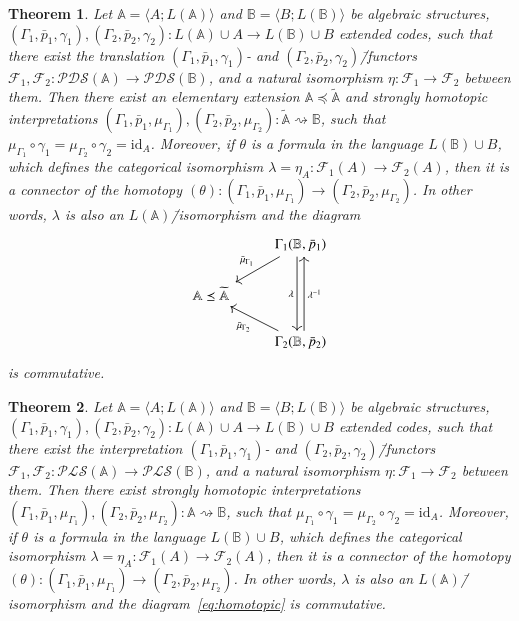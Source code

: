 \documentclass[12pt]{article}
\newtheorem{theorem}{Theorem}
\theoremstyle{definition}
\def\MA{{\mathbb{A}}}
\def\MB{{\mathbb{B}}}
\newcommand{\nsA}{\widetilde{\mathbb A}}
\def\F{{\mathcal{F}}}
\def\PLS{{\mathcal{PLS}}}
\def\PDS{{\mathcal{PDS}}}
\def\id{{\mathrm{id}}}
\begin{document}
\begin{theorem}\label{th:natur_iso1}
Let $\MA=\langle A; L(\MA)\rangle$ and $\MB=\langle B; L(\MB)\rangle$ be algebraic structures, $(\Gamma_1,\bar p_1,\gamma_1),(\Gamma_2,\bar p_2,\gamma_2)\colon L(\MA)\cup A\to L(\MB)\cup B$ extended codes, such that there exist the translation $(\Gamma_1,\bar p_1,\gamma_1)$- and $(\Gamma_2,\bar p_2,\gamma_2)$\=/functors $\F_1,\F_2\colon\PDS(\MA)\to\PDS(\MB)$, and a natural isomorphism $\eta\colon \F_1\to\F_2$ between them. Then there exist an elementary extension $\MA\preceq \nsA$ and strongly homotopic interpretations $(\Gamma_1,\bar p_1,\mu_{\Gamma_1}),(\Gamma_2,\bar p_2,\mu_{\Gamma_2})\colon \nsA \rightsquigarrow \MB$, such that $\mu_{\Gamma_1} \circ\gamma_1=\mu_{\Gamma_2} \circ\gamma_2=\id_A$. Moreover, if $\theta$ is a formula in the language $L(\MB)\cup B$, which defines the categorical isomorphism $\lambda=\eta_A\colon \F_1(A)\to \F_2(A)$, then it is a connector of the homotopy $(\theta)\colon (\Gamma_1,\bar p_1,\mu_{\Gamma_1})\to(\Gamma_2,\bar p_2,\mu_{\Gamma_2})$. In other words, $\lambda$ is also an $L(\MA)$\=/isomorphism and the diagram   
\begin{equation*}
\begin{tikzcd}
& \Gamma_1(\MB,\bar p_1) \ar[dl, "\bar{\mu}_{\Gamma_1}"'] 
\ar[dd, shift right, "\lambda"']\\
\MA\preceq\nsA  & \\
& \Gamma_2(\MB,\bar p_2) 
\ar[ul, "\bar{\mu}_{\Gamma_2}"] 
\ar[uu, shift right, "\lambda^{-1}"']
\end{tikzcd} 
\end{equation*} 
is commutative.    
\end{theorem}

\begin{theorem}\label{th:natur_iso2}
Let $\MA=\langle A; L(\MA)\rangle$ and $\MB=\langle B; L(\MB)\rangle$ be algebraic structures, $(\Gamma_1,\bar p_1,\gamma_1),(\Gamma_2,\bar p_2,\gamma_2)\colon L(\MA)\cup A\to L(\MB)\cup B$ extended codes, such that there exist the interpretation $(\Gamma_1,\bar p_1,\gamma_1)$- and $(\Gamma_2,\bar p_2,\gamma_2)$\=/functors $\F_1,\F_2\colon\PLS(\MA)\to\PLS(\MB)$, and a natural isomorphism $\eta\colon \F_1\to\F_2$ between them. Then there exist strongly homotopic interpretations $(\Gamma_1,\bar p_1,\mu_{\Gamma_1}),(\Gamma_2,\bar p_2,\mu_{\Gamma_2})\colon \MA \rightsquigarrow \MB$, such that $\mu_{\Gamma_1} \circ\gamma_1=\mu_{\Gamma_2} \circ\gamma_2=\id_A$. Moreover, if $\theta$ is a formula in the language $L(\MB)\cup B$, which defines the categorical isomorphism $\lambda=\eta_A\colon \F_1(A)\to \F_2(A)$, then it is a connector of the homotopy $(\theta)\colon (\Gamma_1,\bar p_1,\mu_{\Gamma_1})\to(\Gamma_2,\bar p_2,\mu_{\Gamma_2})$. In other words, $\lambda$ is also an $L(\MA)$\=/isomorphism and the diagram~\eqref{eq:homotopic} is commutative.  
\end{theorem}
\end{document}
